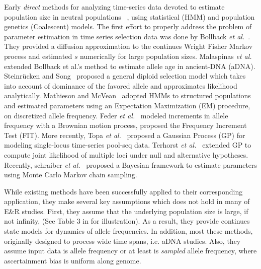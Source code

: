 Early \emph{direct} methods for analyzing time-series data
devoted to estimate population size in neutral populations 
~\cite{williamson1999using,anderson2000monte,beaumont2003estimation,berthier2002likelihood,wang2001pseudo},
 using statistical (HMM) and population genetics (Coalescent) models. 
The first effort to properly address the problem of parameter estimation in time 
series 
selection data was done by Bollback \emph{et 
	al.}~\cite{bollback2008estimation}.
 They provided a diffusion approximation 
	to
the continues Wright Fisher Markov process and estimated $s$
numerically for large population sizes.
Malaspinas \emph{et 
al.}~\cite{malaspinas2012estimating} extended Bollback 
et al.’s 
method to estimate allele age in ancient-DNA (aDNA).
Steinr\"{u}cken and Song~\cite{steinrucken2014novel} proposed a general 
diploid selection model which 
takes into account of dominance of the favored allele and approximates 
likelihood analytically.
Mathieson and McVean~\cite{mathieson2013estimating} adopted HMMs to 
structured populations and estimated parameters using an Expectation 
Maximization (EM) procedure, on discretized allele frequency.
Feder \emph{et al.}~\cite{feder2014Identifying}
modeled increments in allele frequency with a Brownian motion process,  
proposed the Frequency
Increment Test (FIT). More recently, Topa \emph{et
  al.}~\cite{topa2015gaussian} proposed a Gaussian Process (GP) for
modeling single-locus time-series pool-seq data. Terhorst \emph{et
  al.}~\cite{Terhorst2015Multi} extended GP to compute joint
likelihood of multiple loci under null and alternative hypotheses.
Recently, schraiber \emph{et al.}~\cite{schraiber2016bayesian} proposed a 
Bayesian framework to estimate 
parameters using Monte Carlo Markov chain sampling.


While existing methods have been successfully applied to their corresponding 
application, they make several key assumptions which does not hold in many 
of E\&R studies.
First, they assume that the underlying population size is large, if not infinity,
(See Table 3 in \cite{malaspinas2016methods} for illustration). As a result,  
they provide continues state models for dynamics of allele frequencies.
In addition, most these methods, originally designed to process wide time 
spans, i.e. aDNA studies. Also, they assume input data is allele 
frequency or at least is \emph{sampled} allele frequency, where ascertainment 
bias is uniform along genome.

